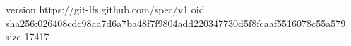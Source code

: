 version https://git-lfs.github.com/spec/v1
oid sha256:026408cdc98aa7d6a7ba48f7f9804add220347730d5f8fcaaf5516078c55a579
size 17417
